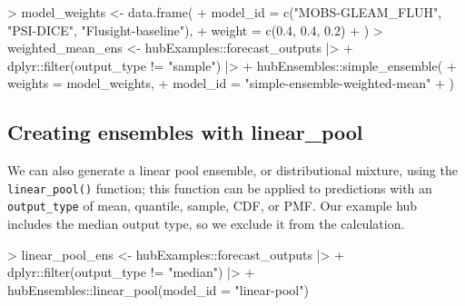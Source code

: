 \documentclass[
]{article}
\newenvironment{Shaded}{\begin{snugshade}}{\end{snugshade}}
\newcommand{\AttributeTok}[1]{\textcolor[rgb]{0.40,0.45,0.13}{#1}}
\newcommand{\FloatTok}[1]{\textcolor[rgb]{0.68,0.00,0.00}{#1}}
\newcommand{\FunctionTok}[1]{\textcolor[rgb]{0.28,0.35,0.67}{#1}}
\newcommand{\NormalTok}[1]{\textcolor[rgb]{0.00,0.23,0.31}{#1}}
\newcommand{\OtherTok}[1]{\textcolor[rgb]{0.00,0.23,0.31}{#1}}
\newcommand{\SpecialCharTok}[1]{\textcolor[rgb]{0.37,0.37,0.37}{#1}}
\newcommand{\StringTok}[1]{\textcolor[rgb]{0.13,0.47,0.30}{#1}}
\begin{document}
\begin{Shaded}
\begin{Highlighting}[]
\SpecialCharTok{\textgreater{}}\NormalTok{ model\_weights }\OtherTok{\textless{}{-}} \FunctionTok{data.frame}\NormalTok{(}
\SpecialCharTok{+}   \AttributeTok{model\_id =} \FunctionTok{c}\NormalTok{(}\StringTok{"MOBS{-}GLEAM\_FLUH"}\NormalTok{, }\StringTok{"PSI{-}DICE"}\NormalTok{, }\StringTok{"Flusight{-}baseline"}\NormalTok{),}
\SpecialCharTok{+}   \AttributeTok{weight =} \FunctionTok{c}\NormalTok{(}\FloatTok{0.4}\NormalTok{, }\FloatTok{0.4}\NormalTok{, }\FloatTok{0.2}\NormalTok{)}
\SpecialCharTok{+}\NormalTok{ )}
\SpecialCharTok{\textgreater{}}\NormalTok{ weighted\_mean\_ens }\OtherTok{\textless{}{-}}\NormalTok{ hubExamples}\SpecialCharTok{::}\NormalTok{forecast\_outputs }\SpecialCharTok{|\textgreater{}}
\SpecialCharTok{+}\NormalTok{   dplyr}\SpecialCharTok{::}\FunctionTok{filter}\NormalTok{(output\_type }\SpecialCharTok{!=} \StringTok{"sample"}\NormalTok{) }\SpecialCharTok{|\textgreater{}}
\SpecialCharTok{+}\NormalTok{   hubEnsembles}\SpecialCharTok{::}\FunctionTok{simple\_ensemble}\NormalTok{(}
\SpecialCharTok{+}     \AttributeTok{weights =}\NormalTok{ model\_weights,}
\SpecialCharTok{+}     \AttributeTok{model\_id =} \StringTok{"simple{-}ensemble{-}weighted{-}mean"}
\SpecialCharTok{+}\NormalTok{   )}
\end{Highlighting}
\end{Shaded}

\subsection{Creating ensembles with
linear\_pool}\label{creating-ensembles-with-linear_pool}

We can also generate a linear pool ensemble, or distributional mixture,
using the \texttt{linear\_pool()} function; this function can be applied
to predictions with an \texttt{output\_type} of mean, quantile, sample,
CDF, or PMF. Our example hub includes the median output type, so we
exclude it from the calculation.

\begin{Shaded}
\begin{Highlighting}[]
\SpecialCharTok{\textgreater{}}\NormalTok{ linear\_pool\_ens }\OtherTok{\textless{}{-}}\NormalTok{ hubExamples}\SpecialCharTok{::}\NormalTok{forecast\_outputs }\SpecialCharTok{|\textgreater{}}
\SpecialCharTok{+}\NormalTok{   dplyr}\SpecialCharTok{::}\FunctionTok{filter}\NormalTok{(output\_type }\SpecialCharTok{!=} \StringTok{"median"}\NormalTok{) }\SpecialCharTok{|\textgreater{}}
\SpecialCharTok{+}\NormalTok{   hubEnsembles}\SpecialCharTok{::}\FunctionTok{linear\_pool}\NormalTok{(}\AttributeTok{model\_id =} \StringTok{"linear{-}pool"}\NormalTok{)}
\end{Highlighting}
\end{Shaded}
\end{document}
